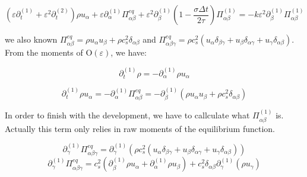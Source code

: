 \documentclass{article}
\newcommand{\Omicron}{\mathrm{O}}
\begin{document}
\begin{equation*}
    \left( \varepsilon \partial _{t}^{( 1)} +\varepsilon ^{2} \partial _{t}^{( 2)}\right) \rho u_{\alpha } +\varepsilon \partial _{\alpha }^{( 1)} \Pi _{\alpha \beta }^{eq} +\varepsilon ^{2} \partial _{\beta }^{( 1)}\left( 1-\frac{\sigma\Delta t}{2\tau }\right) \Pi _{\alpha \beta }^{( 1)} =-k\varepsilon ^{2}\partial _{\beta }^{( 1)}\mathit{\Pi }_{\alpha \beta }^{( 1)}
\end{equation*}

we also known $\Pi _{\alpha \beta }^{eq} =\rho u_{\alpha } u_{\beta } +\rho c_{s}^{2} \delta _{\alpha \beta }$ and $\Pi _{\alpha \beta \gamma }^{eq} =\rho c_{s}^{2}( u_{\alpha } \delta _{\beta \gamma } +u_{\beta } \delta _{\alpha \gamma } +u_{\gamma } \delta _{\alpha \beta })$.
From the moments of $\Omicron(\varepsilon)$, we have:

\begin{equation*}
    \partial _{t}^{( 1)} \rho =-\partial _{\alpha }^{( 1)} \rho u_{\alpha }
\end{equation*}

\begin{equation*}
    \partial _{t}^{( 1)} \rho u_{\alpha } =-\partial _{\alpha }^{( 1)}\mathit{\Pi }_{\alpha \beta }^{eq} =-\partial _{\beta }^{( 1)}\left( \rho u_{\alpha } u_{\beta } +\rho c_{s}^{2} \delta _{\alpha \beta }\right)
\end{equation*}

In order to finish with the development, we have to callculate what $\Pi _{\alpha \beta }^{( 1)}$ is.  Actually this term only relies in raw moments of the equilibrium function.

\begin{equation*}
    \partial _{\gamma }^{( 1)} \Pi _{\alpha \beta \gamma }^{eq} =\partial _{\gamma }^{( 1)}\left( \rho c_{s}^{2}( u_{\alpha } \delta _{\beta \gamma } +u_{\beta } \delta _{\alpha \gamma } +u_{\gamma } \delta _{\alpha \beta })\right)
\end{equation*}
\begin{equation*}
    \partial _{\gamma }^{( 1)} \Pi _{\alpha \beta \gamma }^{eq}=c_{s}^{2}\left( \partial _{\beta }^{( 1)} \rho u_{\alpha } +\partial _{\alpha }^{( 1)} \rho u_{\beta }\right) +c_{s}^{2} \delta _{\alpha \beta } \partial _{\gamma }^{( 1)}( \rho u_{\gamma })
\end{equation*}
\end{document}
